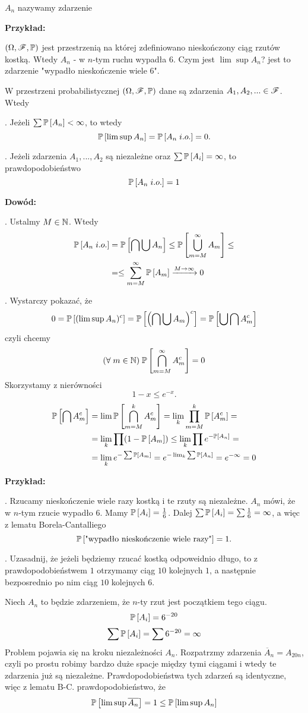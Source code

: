 \indent \point {} $A_n$ nazywamy zdarzenie 

\textbf{Przykład:}

$(\Omega,\mathcal{F},\mathbb{P})$ jest przestrzenią na której zdefiniowano nieskończony ciąg rzutów kostką. Wtedy $A_n$ - w $n$-tym ruchu wypadła $6$. Czym jest $\lim\sup A_n$? jest to zdarzenie "wypadło nieskończenie wiele $6$".

 W przestrzeni probabilistycznej $(\Omega,\mathcal{F},\mathbb{P})$ dane są zdarzenia $A_1,A_2,...\in\mathcal{F}$. Wtedy

. Jeżeli $\sum\mathbb{P}\left[A_n\right]<\infty$, to wtedy 
$$\mathbb{P}\left[\lim\sup A_n\right]=\mathbb{P}\left[A_n\;i.o.\right]=0.$$

. Jeżeli zdarzenia $A_1,...,A_2$ są niezależne oraz $\sum\mathbb{P}\left[A_i\right]=\infty$, to prawdopodobieństwo
$$\mathbb{P}\left[A_n\;i.o.\right]=1$$

\textbf{Dowód:} 

. Ustalmy $M\in\mathbb{N}$. Wtedy
\begin{align*}
    \mathbb{P}\left[A_n\;i.o.\right]&=\mathbb{P}\left[\bigcap\bigcup A_n\right]\leq\mathbb{P}\left[\bigcup\limits_{m=M}^\infty A_m\right]\leq\\
    &=\leq\sum\limits_{m=M}^\infty \mathbb{P}\left[A_m\right]\xrightarrow[]{M\to\infty}0
\end{align*}

. Wystarczy pokazać, że 
$$0=\mathbb{P}\left[(\lim\sup A_n)^c\right]=\mathbb{P}\left[\left(\bigcap\bigcup A_m\right)^c\right]=\mathbb{P}\left[\bigcup\bigcap A_m^c\right]$$
czyli chcemy 
$$(\forall\;m\in\mathbb{N})\;\mathbb{P}\left[\bigcap\limits_{m=M}^\infty A_m^c\right]=0$$
Skorzystamy z nierówności
$$1-x\leq e^{-x}.$$
\begin{align*}
    \mathbb{P}\left[\bigcap A_m^c\right]&=\lim\mathbb{P}\left[\bigcap\limits_{m=M}^k A_m^c\right]=\lim_k\prod\limits_{m=M}^k\mathbb{P}\left[A_m^c\right]=\\
    &=\lim_k\prod(1-\mathbb{P}\left[A_m\right])\leq \lim_k\prod e^{-\mathbb{P}\left[A_n\right]}=\\
    &=\lim_ke^{-\sum\mathbb{P}\left[A_m\right]}=e^{-\lim_k\sum\mathbb{P}\left[A_n\right]}=e^{-\infty}=0
\end{align*}

\textbf{Przykład:}

. Rzucamy nieskończenie wiele razy kostką i te rzuty są niezależne. $A_n$ mówi, że w $n$-tym rzucie wypadło $6$. Mamy $\mathbb{P}\left[A_i\right]=\frac16$. Dalej $\sum\mathbb{P}\left[A_i\right]=\sum\frac16=\infty$, a więc z lematu Borela-Cantalliego 
$$\mathbb{P}\left[\text{"wypadło nieskończenie wiele razy"}\right]=1.$$

. Uzasadnij, że jeżeli będziemy rzucać kostką odpoweidnio długo, to z prawdopodobieństwem $1$ otrzymamy ciąg $10$ kolejnych $1$, a następnie bezposrednio po nim ciąg $10$ kolejnych $6$.

Niech $A_n$ to będzie zdarzeniem, że $n$-ty rzut jest początkiem tego ciągu.
$$\mathbb{P}\left[A_i\right]=6^{-20}$$
$$\sum\mathbb{P}\left[A_i\right]=\sum6^{-20}=\infty$$
Problem pojawia się na kroku niezależności $A_n$. Rozpatrzmy zdarzenia $\overline{A}_n=A_{20n}$, czyli po prostu robimy bardzo duże spacje między tymi ciągami i wtedy te zdarzenia już są niezależne. Prawdopodobieństwa tych zdarzeń są identyczne, więc z lematu B-C. prawdopodobieństwo, że 
$$\mathbb{P}\left[\lim\sup \overline{A_n}\right]=1\leq\mathbb{P}\left[\lim\sup A_n\right]$$